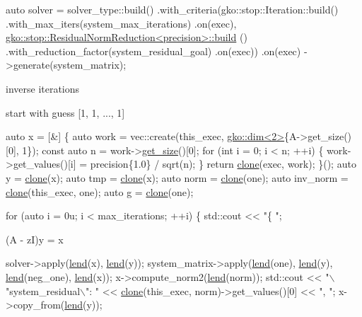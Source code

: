 \begin{DoxyCode}
\textcolor{keyword}{auto} solver =
    solver\_type::build()
        .with\_criteria(gko::stop::Iteration::build()
                           .with\_max\_iters(system\_max\_iterations)
                           .on(exec),
                       \hyperlink{classgko_1_1stop_1_1ResidualNormReduction}{gko::stop::ResidualNormReduction<precision>::build}
      ()
                           .with\_reduction\_factor(system\_residual\_goal)
                           .on(exec))
        .on(exec)
        ->generate(system\_matrix);
\end{DoxyCode}


inverse iterations

start with guess \mbox{[}1, 1, ..., 1\mbox{]}


\begin{DoxyCode}
\textcolor{keyword}{auto} x = [&] \{
    \textcolor{keyword}{auto} work = vec::create(this\_exec, \hyperlink{structgko_1_1dim}{gko::dim<2>}\{A->get\_size()[0], 1\});
    \textcolor{keyword}{const} \textcolor{keyword}{auto} n = work->\hyperlink{classgko_1_1LinOp_a31b3c003388eb0b95393154f68c2b98d}{get\_size}()[0];
    \textcolor{keywordflow}{for} (\textcolor{keywordtype}{int} i = 0; i < n; ++i) \{
        work->get\_values()[i] = precision\{1.0\} / sqrt(n);
    \}
    \textcolor{keywordflow}{return} \hyperlink{namespacegko_a1beb80750459e4201aa9d882d2d074c3}{clone}(exec, work);
\}();
\textcolor{keyword}{auto} y = \hyperlink{namespacegko_a1beb80750459e4201aa9d882d2d074c3}{clone}(x);
\textcolor{keyword}{auto} tmp = \hyperlink{namespacegko_a1beb80750459e4201aa9d882d2d074c3}{clone}(x);
\textcolor{keyword}{auto} norm = \hyperlink{namespacegko_a1beb80750459e4201aa9d882d2d074c3}{clone}(one);
\textcolor{keyword}{auto} inv\_norm = \hyperlink{namespacegko_a1beb80750459e4201aa9d882d2d074c3}{clone}(this\_exec, one);
\textcolor{keyword}{auto} g = \hyperlink{namespacegko_a1beb80750459e4201aa9d882d2d074c3}{clone}(one);

\textcolor{keywordflow}{for} (\textcolor{keyword}{auto} i = 0u; i < max\_iterations; ++i) \{
    std::cout << \textcolor{stringliteral}{"\{ "};
\end{DoxyCode}


(A -\/ zI)y = x


\begin{DoxyCode}
solver->apply(\hyperlink{namespacegko_aa8cb4876b72e5e1036ea9575443c439b}{lend}(x), \hyperlink{namespacegko_aa8cb4876b72e5e1036ea9575443c439b}{lend}(y));
system\_matrix->apply(\hyperlink{namespacegko_aa8cb4876b72e5e1036ea9575443c439b}{lend}(one), \hyperlink{namespacegko_aa8cb4876b72e5e1036ea9575443c439b}{lend}(y), \hyperlink{namespacegko_aa8cb4876b72e5e1036ea9575443c439b}{lend}(neg\_one), \hyperlink{namespacegko_aa8cb4876b72e5e1036ea9575443c439b}{lend}(x));
x->compute\_norm2(\hyperlink{namespacegko_aa8cb4876b72e5e1036ea9575443c439b}{lend}(norm));
std::cout << \textcolor{stringliteral}{"\(\backslash\)"system\_residual\(\backslash\)": "}
          << \hyperlink{namespacegko_a1beb80750459e4201aa9d882d2d074c3}{clone}(this\_exec, norm)->get\_values()[0] << \textcolor{stringliteral}{", "};
x->copy\_from(\hyperlink{namespacegko_aa8cb4876b72e5e1036ea9575443c439b}{lend}(y));
\end{DoxyCode}


